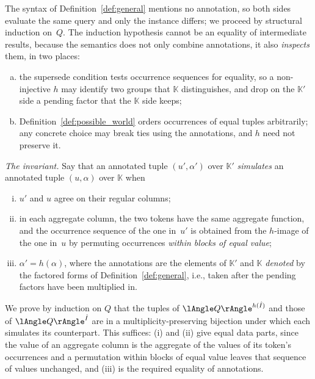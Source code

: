 \begin{appendixproof}
The syntax of Definition~\ref{def:general} mentions no annotation, so both
sides evaluate the same query and only the instance differs; we proceed
by structural induction on~$Q$. The induction hypothesis cannot be an
equality of intermediate results, because the semantics does not only
combine annotations, it also \emph{inspects} them, in two places:
\begin{enumerate}[(a)]
\item the supersede condition tests occurrence sequences for equality,
  so a non-injective $h$ may identify two groups that $\mathbb K$
  distinguishes, and drop on the $\mathbb K'$ side a pending factor that
  the $\mathbb K$ side keeps;
\item Definition~\ref{def:possible_world} orders occurrences of equal
  tuples arbitrarily; any concrete choice may break ties using the
  annotations, and $h$ need not preserve it.
\end{enumerate}

\smallskip\noindent\emph{The invariant.} Say that an annotated tuple
$(u',\alpha')$ over $\mathbb K'$ \emph{simulates} an annotated tuple
$(u,\alpha)$ over $\mathbb K$ when
\begin{enumerate}[(i)]
\item $u'$ and $u$ agree on their regular columns;
\item in each aggregate column, the two tokens have the same aggregate
  function, and the occurrence sequence of the one in~$u'$ is obtained
  from the $h$-image of the one in~$u$ by permuting occurrences
  \emph{within blocks of equal value};
\item $\alpha'=h(\alpha)$, where the annotations are the elements of
  $\mathbb K'$ and $\mathbb K$ \emph{denoted} by the factored forms of
  Definition~\ref{def:general}, i.e., taken after the pending factors
  have been multiplied in.
\end{enumerate}
We prove by induction on $Q$ that the tuples of
$\angsem{h(\hat I)}{Q}$ and those of $\angsem{\hat I}{Q}$ are in a
multiplicity-preserving bijection under which each simulates its
counterpart. This suffices: (i) and (ii) give equal data parts, since the
value of an aggregate column is the aggregate of the values of its
token's occurrences and a permutation within blocks of equal value leaves
that sequence of values unchanged, and (iii) is the required equality of
annotations.


\end{appendixproof}
